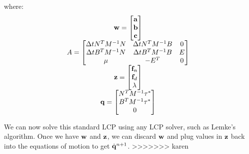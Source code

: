 where:
\begin{equation}
\label{eq:slcp1}
\begin{array}{cc}
\mathbf{w} = \left[\begin{matrix} \mathbf{a} \\ \mathbf{b} \\ \mathbf{c}\end{matrix}\right] \\
A = \left[\begin{matrix}\Delta t N^TM^{-1}N & \Delta t N^TM^{-1}B & 0 \\ \Delta t B^TM^{-1}N & \Delta t B^TM^{-1}B & E \\ \mu & -E^T & 0\end{matrix}\right] \\
\mathbf{z} = \left[\begin{matrix}\mathbf{f}_n \\ \mathbf{f}_d \\ \lambda\end{matrix}\right] \\
\mathbf{q} = \left[\begin{matrix}N^TM^{-1}\tau^* \\ B^TM^{-1}\tau^* \\ 0\end{matrix}\right]
\end{array}
\end{equation}

We can now solve this standard LCP using any LCP solver, such as
Lemke's algorithm. Once we have $\mathbf{w}$ and $\mathbf{z}$, we can discard
$\mathbf{w}$ and plug values in $\mathbf{z}$ back into the equations of motion
to get $\dot{\mathbf{q}}^{n + 1}$.
>>>>>>> karen
